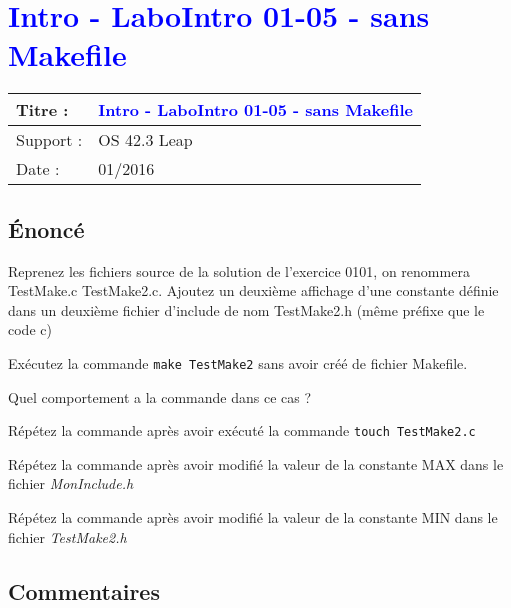 \lstset{language=c}
\renewcommand{\titre}{\textcolor{blue}{ Intro - LaboIntro 01-05 - sans Makefile }}

\lhead{ \titre }
\section{{\titre} }

\begin{tabular}{|l|l|}
\hline
Titre : 	& \titre \\\hline
Support : 	& OS 42.3 Leap \\\hline
Date :		& 01/2016 \\\hline
\end{tabular}

\subsection{Énoncé}

Reprenez les fichiers source de la solution de l'exercice 0101, on renommera TestMake.c TestMake2.c. 
Ajoutez un deuxième affichage d'une constante définie dans un deuxième fichier d'include de nom TestMake2.h (même préfixe que le code c)

Exécutez la commande \texttt{make TestMake2} sans avoir créé de fichier Makefile.

Quel comportement a la commande dans ce cas ? 

Répétez la commande après avoir exécuté la commande \texttt{touch TestMake2.c}

Répétez la commande après avoir modifié la valeur de la constante MAX dans le fichier \emph{MonInclude.h}

Répétez la commande après avoir modifié la valeur de la constante MIN dans le fichier \emph{TestMake2.h}





\subsection{Commentaires}

